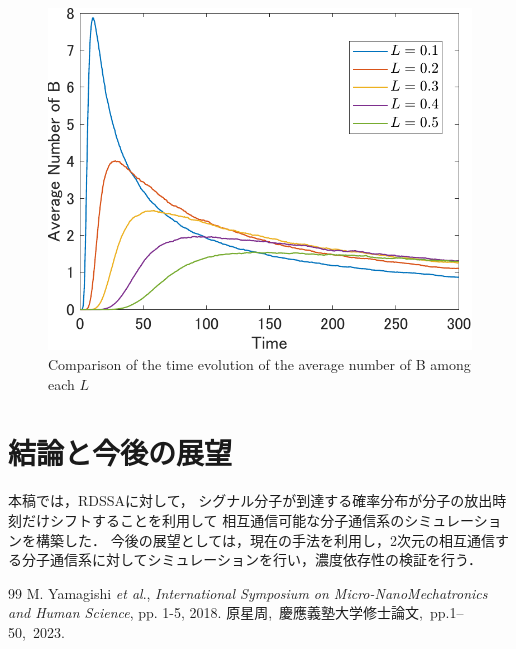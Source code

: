 \documentclass[twocolumn]{jarticle}
\begin{document}
\begin{figure}[tb]
    \centering
    \includegraphics[width=0.8\columnwidth]{figures/figure_name.pdf}
    \caption{Comparison of the time evolution of the average number of B among each $L$}
    \label{fig:simulation}
\end{figure}


\section{結論と今後の展望}
本稿では，RDSSA\cite{hara}に対して，
シグナル分子が到達する確率分布が分子の放出時刻だけシフトすることを利用して
相互通信可能な分子通信系のシミュレーションを構築した．
今後の展望としては，現在の手法を利用し，2次元の相互通信する分子通信系に対してシミュレーションを行い，濃度依存性の検証を行う．



\begin{thebibliography} {99}
     M. Yamagishi {\it et al}., %
    { \it International Symposium on Micro-NanoMechatronics and Human Science}, pp. 1-5, 2018.
     原星周,\ 慶應義塾大学修士論文,\ pp.1--50,\ 2023.
\end{thebibliography}
\end{document}

